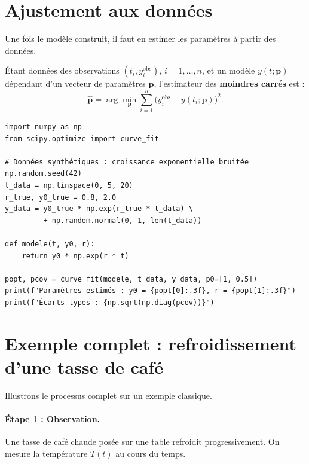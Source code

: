 \section{Ajustement aux donn\'ees}
\label{sec:ajustement}

Une fois le mod\`ele construit, il faut en estimer les param\`etres
\`a partir des donn\'ees.

\begin{definition}
\'Etant donn\'ees des observations $(t_i, y_i^{\mathrm{obs}})$,
$i=1,\ldots,n$, et un mod\`ele $y(t;\mathbf{p})$ d\'ependant d'un
vecteur de param\`etres $\mathbf{p}$, l'estimateur des
\textbf{moindres carr\'es} est :
\[
  \hat{\mathbf{p}} = \arg\min_{\mathbf{p}}
    \sum_{i=1}^{n} \bigl(y_i^{\mathrm{obs}} - y(t_i;\mathbf{p})\bigr)^2.
\]
\end{definition}

\begin{codeblock}[title=\textbf{Ajustement par moindres carr\'es}]
\begin{verbatim}
import numpy as np
from scipy.optimize import curve_fit

# Données synthétiques : croissance exponentielle bruitée
np.random.seed(42)
t_data = np.linspace(0, 5, 20)
r_true, y0_true = 0.8, 2.0
y_data = y0_true * np.exp(r_true * t_data) \
         + np.random.normal(0, 1, len(t_data))

def modele(t, y0, r):
    return y0 * np.exp(r * t)

popt, pcov = curve_fit(modele, t_data, y_data, p0=[1, 0.5])
print(f"Paramètres estimés : y0 = {popt[0]:.3f}, r = {popt[1]:.3f}")
print(f"Écarts-types : {np.sqrt(np.diag(pcov))}")
\end{verbatim}
\end{codeblock}

\section{Exemple complet : refroidissement d'une tasse de caf\'e}
\label{sec:cafe}

Illustrons le processus complet sur un exemple classique.

\paragraph{\'Etape 1 : Observation.}
Une tasse de caf\'e chaude pos\'ee sur une table refroidit progressivement.
On mesure la temp\'erature $T(t)$ au cours du temps.

